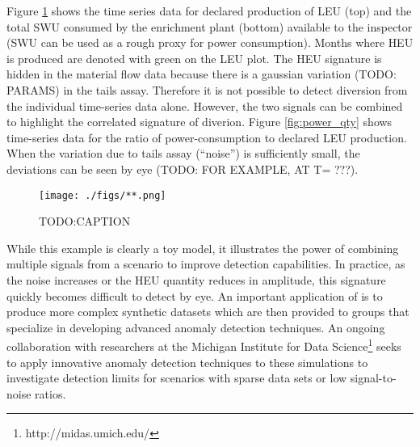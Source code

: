 Figure \ref{fig:time_series} shows the time series data for declared production of \gls{LEU} (top) and the total SWU consumed by the enrichment plant (bottom) available to the inspector (SWU can be used as a rough proxy for power consumption).  Months where \gls{HEU} is produced are denoted with green on the \gls{LEU} plot.  The \gls{HEU} signature is hidden in the material flow data because there is a gaussian variation (TODO: PARAMS) in the tails assay.  Therefore it is not possible to detect diversion from the individual time-series data alone. However, the two signals can be combined to highlight the correlated signature of diverion. Figure \ref{fig:power_qty} shows time-series data for the ratio of power-consumption to declared \gls{LEU} production.  When the variation due to tails assay (``noise'') is sufficiently small, the deviations can be seen by eye (TODO: FOR EXAMPLE, AT T= ???).

\begin{figure}%
\begin{center}
\texttt{[image: ./figs/**.png]}
\end{center}
\caption{TODO:CAPTION}
\label{fig:time_series}
\end{figure}

While this example is clearly a toy model, it illustrates the power of combining multiple signals from a scenario to improve detection capabilities. In practice, as the noise increases or the \gls{HEU} quantity reduces in amplitude, this signature quickly becomes difficult to detect by eye. An important application of \Cyclus is to produce more complex synthetic datasets which are then provided to groups that specialize in developing advanced anomaly detection techniques. An ongoing collaboration with researchers at the Michigan Institute for Data Science\footnote{http://midas.umich.edu/} seeks to apply innovative anomaly detection techniques to these simulations to investigate detection limits for scenarios with sparse data sets or low signal-to-noise ratios.

